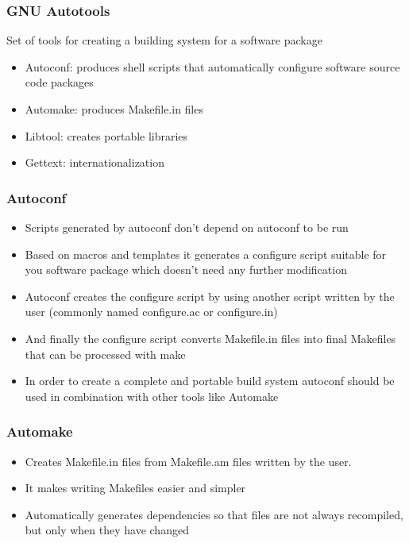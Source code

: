\begin{frame}
  \frametitle{GNU Autotools}
  Set of tools for creating a building system for a software package
  \begin{itemize}
  \item Autoconf: produces shell scripts that automatically configure
    software source code packages
  \item Automake: produces Makefile.in files 
  \item Libtool: creates portable libraries
  \item Gettext: internationalization 
  \end{itemize}
\end{frame}

\begin{frame}
  \frametitle{Autoconf}
  \begin{itemize}
  \item Scripts generated by autoconf don't depend on autoconf to be run
  \item Based on macros and templates it generates a configure script
    suitable for you software package which doesn't need any further
    modification
  \item Autoconf creates the configure script by using another script written by
    the user (commonly named configure.ac or configure.in)
  \item And finally the configure script converts Makefile.in files
    into final Makefiles that can be processed with make
  \item In order to create a complete and portable build system
    autoconf should be used in combination with other tools like Automake
  \end{itemize}
\end{frame}

\begin{frame}
  \frametitle{Automake}
  \begin{itemize}
  \item Creates Makefile.in files from Makefile.am files written by
    the user.
  \item It makes writing Makefiles easier and simpler
  \item Automatically generates dependencies so that files are not
    always recompiled, but only when they have changed
  \end{itemize}
\end{frame}

